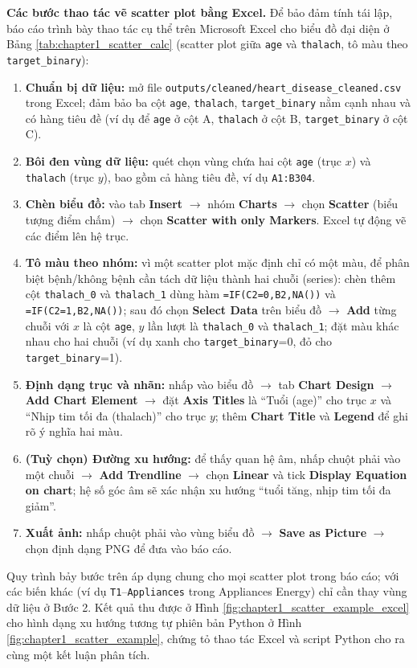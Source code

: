 \textbf{Các bước thao tác vẽ scatter plot bằng Excel.} Để bảo đảm tính tái lập, báo cáo trình bày thao tác cụ thể trên Microsoft Excel cho biểu đồ đại diện ở Bảng \ref{tab:chapter1_scatter_calc} (scatter plot giữa \texttt{age} và \texttt{thalach}, tô màu theo \texttt{target\_binary}):
\begin{enumerate}[leftmargin=2.2em,label=\textbf{Bước \arabic*.}]
 \item \textbf{Chuẩn bị dữ liệu:} mở file \texttt{outputs/cleaned/heart\_disease\_cleaned.csv} trong Excel; đảm bảo ba cột \texttt{age}, \texttt{thalach}, \texttt{target\_binary} nằm cạnh nhau và có hàng tiêu đề (ví dụ để \texttt{age} ở cột A, \texttt{thalach} ở cột B, \texttt{target\_binary} ở cột C).
 \item \textbf{Bôi đen vùng dữ liệu:} quét chọn vùng chứa hai cột \texttt{age} (trục $x$) và \texttt{thalach} (trục $y$), bao gồm cả hàng tiêu đề, ví dụ \texttt{A1:B304}.
 \item \textbf{Chèn biểu đồ:} vào tab \textbf{Insert} $\rightarrow$ nhóm \textbf{Charts} $\rightarrow$ chọn \textbf{Scatter} (biểu tượng điểm chấm) $\rightarrow$ chọn \textbf{Scatter with only Markers}. Excel tự động vẽ các điểm lên hệ trục.
 \item \textbf{Tô màu theo nhóm:} vì một scatter plot mặc định chỉ có một màu, để phân biệt bệnh/không bệnh cần tách dữ liệu thành hai chuỗi (series): chèn thêm cột \texttt{thalach\_0} và \texttt{thalach\_1} dùng hàm \texttt{=IF(C2=0,B2,NA())} và \texttt{=IF(C2=1,B2,NA())}; sau đó chọn \textbf{Select Data} trên biểu đồ $\rightarrow$ \textbf{Add} từng chuỗi với $x$ là cột \texttt{age}, $y$ lần lượt là \texttt{thalach\_0} và \texttt{thalach\_1}; đặt màu khác nhau cho hai chuỗi (ví dụ xanh cho \texttt{target\_binary}=0, đỏ cho \texttt{target\_binary}=1).
 \item \textbf{Định dạng trục và nhãn:} nhấp vào biểu đồ $\rightarrow$ tab \textbf{Chart Design} $\rightarrow$ \textbf{Add Chart Element} $\rightarrow$ đặt \textbf{Axis Titles} là ``Tuổi (age)'' cho trục $x$ và ``Nhịp tim tối đa (thalach)'' cho trục $y$; thêm \textbf{Chart Title} và \textbf{Legend} để ghi rõ ý nghĩa hai màu.
 \item \textbf{(Tuỳ chọn) Đường xu hướng:} để thấy quan hệ âm, nhấp chuột phải vào một chuỗi $\rightarrow$ \textbf{Add Trendline} $\rightarrow$ chọn \textbf{Linear} và tick \textbf{Display Equation on chart}; hệ số góc âm sẽ xác nhận xu hướng ``tuổi tăng, nhịp tim tối đa giảm''.
 \item \textbf{Xuất ảnh:} nhấp chuột phải vào vùng biểu đồ $\rightarrow$ \textbf{Save as Picture} $\rightarrow$ chọn định dạng PNG để đưa vào báo cáo.
\end{enumerate}
Quy trình bảy bước trên áp dụng chung cho mọi scatter plot trong báo cáo; với các biến khác (ví dụ \texttt{T1}--\texttt{Appliances} trong Appliances Energy) chỉ cần thay vùng dữ liệu ở Bước 2. Kết quả thu được ở Hình \ref{fig:chapter1_scatter_example_excel} cho hình dạng xu hướng tương tự phiên bản Python ở Hình \ref{fig:chapter1_scatter_example}, chứng tỏ thao tác Excel và script Python cho ra cùng một kết luận phân tích.

